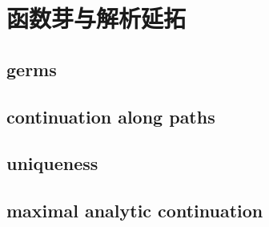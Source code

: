 \section{函数芽与解析延拓}
\label{b3:sec:0902}


\subsection{germs}
\label{b3:subsec:090201}

\subsection{continuation along paths}
\label{b3:subsec:090202}

\subsection{uniqueness}
\label{b3:subsec:090203}

\subsection{maximal analytic continuation}
\label{b3:subsec:090204}


